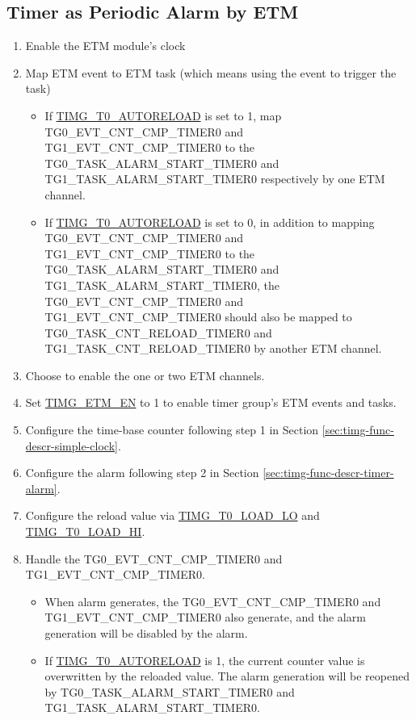 \documentclass[main\_\_EN.tex]{subfiles}
\begin{document}
\subsection{Timer as Periodic Alarm by ETM} \label{sec:timg-conf-etm}
\begin{enumerate}
    \item Enable the ETM module's clock
    \item Map ETM event to ETM task (which means using the event to trigger the task)
    \begin{itemize}
        \item If \hyperref[fielddesc:TIMGTXAUTORELOAD]{TIMG\_T0\_AUTORELOAD} is set to 1, map TG0\_EVT\_CNT\_CMP\_TIMER0 and TG1\_EVT\_CNT\_CMP\_TIMER0 to the TG0\_TASK\_ALARM\_START\_TIMER0 and TG1\_TASK\_ALARM\_START\_TIMER0 respectively by one ETM channel.
        \item If \hyperref[fielddesc:TIMGTXAUTORELOAD]{TIMG\_T0\_AUTORELOAD} is set to 0, in addition to mapping TG0\_EVT\_CNT\_CMP\_TIMER0 and TG1\_EVT\_CNT\_CMP\_TIMER0 to the TG0\_TASK\_ALARM\_START\_TIMER0 and TG1\_TASK\_ALARM\_START\_TIMER0, the TG0\_EVT\_CNT\_CMP\_TIMER0 and TG1\_EVT\_CNT\_CMP\_TIMER0 should also be mapped to TG0\_TASK\_CNT\_RELOAD\_TIMER0 and TG1\_TASK\_CNT\_RELOAD\_TIMER0 by another ETM channel.
    \end{itemize}
    \item Choose to enable the one or two ETM channels.
    \item Set \hyperref[fielddesc:TIMGETMEN]{TIMG\_ETM\_EN} to 1 to enable timer group's ETM events and tasks.
    \item Configure the time-base counter following step 1 in Section \ref{sec:timg-func-descr-simple-clock}.
    \item Configure the alarm following step 2 in Section \ref{sec:timg-func-descr-timer-alarm}.
    \item Configure the reload value via \hyperref[fielddesc:TIMGTXLOADLO]{TIMG\_T0\_LOAD\_LO} and \hyperref[fielddesc:TIMGTXLOADHI]{TIMG\_T0\_LOAD\_HI}.
    \item Handle the TG0\_EVT\_CNT\_CMP\_TIMER0 and TG1\_EVT\_CNT\_CMP\_TIMER0.
    \begin{itemize}
        \item When alarm generates, the TG0\_EVT\_CNT\_CMP\_TIMER0 and TG1\_EVT\_CNT\_CMP\_TIMER0 also generate, and the alarm generation will be disabled by the alarm.
        \item If \hyperref[fielddesc:TIMGTXAUTORELOAD]{TIMG\_T0\_AUTORELOAD} is 1, the current counter value is overwritten by the reloaded value. The alarm generation will be reopened by TG0\_TASK\_ALARM\_START\_TIMER0 and TG1\_TASK\_ALARM\_START\_TIMER0.

\end{itemize}
\end{enumerate}
\end{document}
